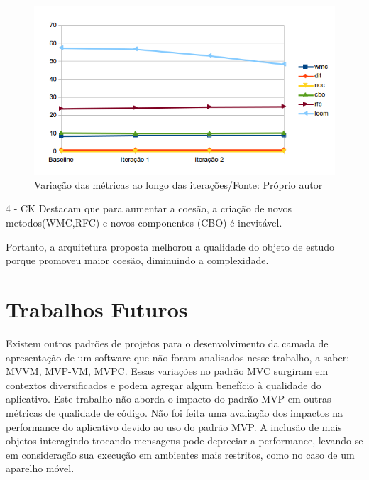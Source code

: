 \begin{figure}[!h]
	\centering
	\includegraphics{img/allmetrics}
	\caption{Variação das métricas ao longo das iterações/Fonte: Próprio autor}
	\label{fig:allmetrics}
\end{figure}


4 - CK Destacam que para aumentar a coesão, a criação de novos
 metodos(WMC,RFC) e novos componentes (CBO) é inevitável.


Portanto, a arquitetura proposta melhorou a qualidade do objeto de estudo porque
promoveu maior coesão, diminuindo a complexidade.

 
\section{Trabalhos Futuros}

Existem outros padrões de projetos para o desenvolvimento da camada de
apresentação de um software que não foram analisados nesse trabalho, a saber: 
MVVM, MVP-VM, MVPC. Essas variações no padrão MVC surgiram em contextos
diversificados e podem agregar algum benefício à qualidade do aplicativo.
Este trabalho não aborda o impacto do padrão MVP em outras métricas de qualidade
de código.
Não foi feita uma avaliação dos impactos na performance do aplicativo devido ao
uso do padrão MVP. A inclusão de mais objetos interagindo trocando mensagens
pode depreciar a performance, levando-se em consideração sua execução em
ambientes mais restritos, como no caso de um aparelho móvel.